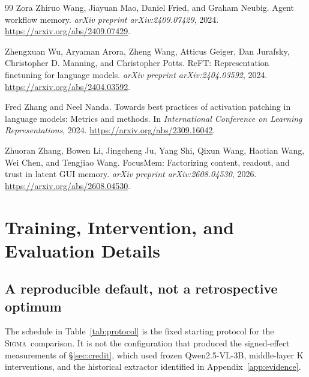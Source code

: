 \documentclass{article}
\newcommand{\method}{\textsc{Sigma}}
\begin{document}
\begin{thebibliography}{99}
Zora Zhiruo Wang, Jiayuan Mao, Daniel Fried, and Graham Neubig.
Agent workflow memory. \emph{arXiv preprint arXiv:2409.07429}, 2024.
\url{https://arxiv.org/abs/2409.07429}.

Zhengxuan Wu, Aryaman Arora, Zheng Wang, Atticus Geiger, Dan Jurafsky, Christopher D. Manning, and Christopher Potts.
ReFT: Representation finetuning for language models.
\emph{arXiv preprint arXiv:2404.03592}, 2024.
\url{https://arxiv.org/abs/2404.03592}.

Fred Zhang and Neel Nanda.
Towards best practices of activation patching in language models: Metrics and methods.
In \emph{International Conference on Learning Representations}, 2024.
\url{https://arxiv.org/abs/2309.16042}.

Zhuoran Zhang, Bowen Li, Jingcheng Ju, Yang Shi, Qixun Wang, Haotian Wang, Wei Chen, and Tengjiao Wang.
FocusMem: Factorizing content, readout, and trust in latent GUI memory.
\emph{arXiv preprint arXiv:2608.04530}, 2026.
\url{https://arxiv.org/abs/2608.04530}.
\end{thebibliography}

\clearpage
\appendix
\section{Training, Intervention, and Evaluation Details}
\label{app:protocol}
\subsection{A reproducible default, not a retrospective optimum}
The schedule in Table~\ref{tab:protocol} is the fixed starting protocol for the
\method\ comparison. It is not the configuration that produced the signed-effect
measurements of \S\ref{sec:credit}, which used frozen Qwen2.5-VL-3B,
middle-layer K interventions, and the historical extractor identified in
Appendix~\ref{app:evidence}.
\end{document}
